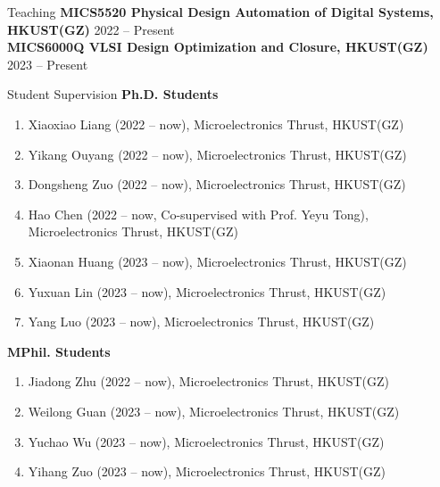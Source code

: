 \iffalse
\begin{rSection}{Teaching}
\begin{tabbing}
\hspace{1.0in}\= \kill
    Spring 2023 \> VLSI Design Optimization and Closure \\
    Fall 2022 \> Physical Design Automation of Digital Systems \\
\end{tabbing}
\end{rSection}
\fi

\begin{rSection}{Teaching}
	{\bf MICS5520 Physical Design Automation of Digital Systems, HKUST(GZ)}\hfill { 2022 -- Present}\\
	
	{\bf MICS6000Q VLSI Design Optimization and Closure, HKUST(GZ)}\hfill { 2023 -- Present}\\
	
\end{rSection}

\begin{rSection}{Student Supervision}
{\bf Ph.D. Students}
\begin{enumerate}
	\item Xiaoxiao Liang (2022 -- now), Microelectronics Thrust, HKUST(GZ)
	\item Yikang Ouyang (2022 -- now), Microelectronics Thrust, HKUST(GZ)
	\item Dongsheng Zuo (2022 -- now), Microelectronics Thrust, HKUST(GZ)
	\item Hao Chen (2022 -- now, Co-supervised with Prof. Yeyu Tong), Microelectronics Thrust, HKUST(GZ)
	\item Xiaonan Huang (2023 -- now), Microelectronics Thrust, HKUST(GZ)
	\item Yuxuan Lin (2023 -- now), Microelectronics Thrust, HKUST(GZ)
	\item Yang Luo (2023 -- now), Microelectronics Thrust, HKUST(GZ)
\end{enumerate}

{\bf MPhil. Students}
\begin{enumerate}
	\item Jiadong Zhu (2022 -- now), Microelectronics Thrust, HKUST(GZ)
	\item Weilong Guan (2023 -- now), Microelectronics Thrust, HKUST(GZ)
	\item Yuchao Wu (2023 -- now), Microelectronics Thrust, HKUST(GZ)
	\item Yihang Zuo (2023 -- now), Microelectronics Thrust, HKUST(GZ)
\end{enumerate}
\end{rSection}
